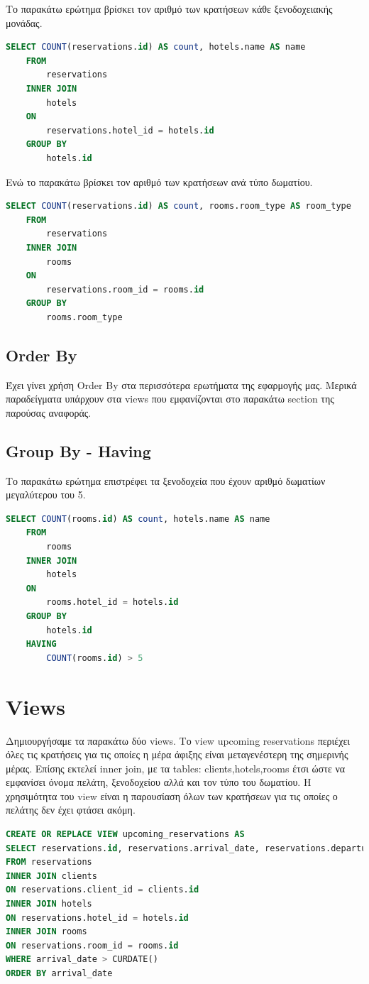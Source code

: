 \documentclass[a4paper,12pt]{article}
\begin{document}
	Το παρακάτω ερώτημα βρίσκει τον αριθμό των κρατήσεων κάθε ξενοδοχειακής μονάδας.
	\begin{lstlisting}[language=SQL]
SELECT COUNT(reservations.id) AS count, hotels.name AS name
	FROM 
		reservations
	INNER JOIN 
		hotels
	ON 
		reservations.hotel_id = hotels.id
	GROUP BY 
		hotels.id
	\end{lstlisting}
	Ενώ το παρακάτω βρίσκει τον αριθμό των κρατήσεων ανά τύπο δωματίου.
	\begin{lstlisting}[language=SQL]
SELECT COUNT(reservations.id) AS count, rooms.room_type AS room_type
	FROM 
		reservations
	INNER JOIN 
		rooms
	ON 
		reservations.room_id = rooms.id
	GROUP BY 
		rooms.room_type
	\end{lstlisting}
	
	\subsection{Order By}
	Έχει γίνει χρήση Order By στα περισσότερα ερωτήματα της εφαρμογής μας. Μερικά παραδείγματα υπάρχουν στα views που εμφανίζονται στο παρακάτω section της παρούσας αναφοράς.
	
	\subsection{Group By - Having}
	Το παρακάτω ερώτημα επιστρέφει τα ξενοδοχεία που έχουν αριθμό δωματίων μεγαλύτερου του 5.
	\begin{lstlisting}[language=SQL]
SELECT COUNT(rooms.id) AS count, hotels.name AS name
	FROM 
		rooms
	INNER JOIN 
		hotels
	ON 
		rooms.hotel_id = hotels.id
	GROUP BY 
		hotels.id
	HAVING 
		COUNT(rooms.id) > 5
	\end{lstlisting}

\section{Views}
Δημιουργήσαμε τα παρακάτω δύο views.
Το view upcoming reservations περιέχει όλες τις κρατήσεις για τις οποίες η μέρα άφιξης είναι μεταγενέστερη της σημερινής μέρας. Επίσης εκτελεί inner join, με τα tables: clients,hotels,rooms έτσι ώστε να εμφανίσει όνομα πελάτη, ξενοδοχείου αλλά και τον τύπο του δωματίου. Η χρησιμότητα του view είναι η παρουσίαση όλων των κρατήσεων για τις οποίες ο πελάτης δεν έχει φτάσει ακόμη.

\begin{lstlisting}[language=SQL]
CREATE OR REPLACE VIEW upcoming_reservations AS
SELECT reservations.id, reservations.arrival_date, reservations.departure_date, reservations.created_at, reservations.updated_at, clients.first_name, clients.last_name, hotels.name, rooms.room_type
FROM reservations
INNER JOIN clients
ON reservations.client_id = clients.id
INNER JOIN hotels
ON reservations.hotel_id = hotels.id
INNER JOIN rooms
ON reservations.room_id = rooms.id
WHERE arrival_date > CURDATE()
ORDER BY arrival_date
\end{lstlisting}
\end{document}
